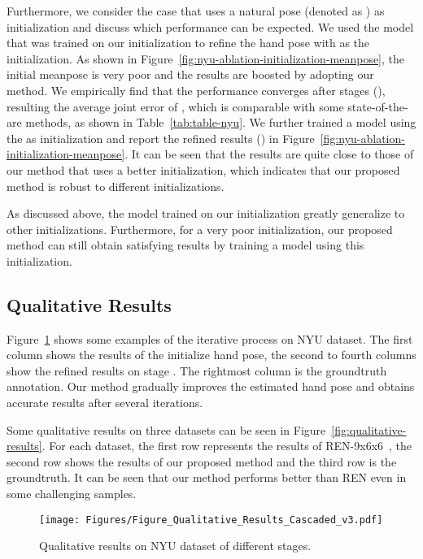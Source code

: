 \documentclass[final, 5p]{elsarticle}
\begin{document}
Furthermore, we consider the case that uses a natural pose (denoted as ) as initialization and discuss which performance can be expected. We used the model that was trained on our initialization to refine the hand pose with  as the initialization. As shown in Figure~\ref{fig:nyu-ablation-initialization-meanpose}, the initial meanpose is very poor and the results are boosted by adopting our method. We empirically find that the performance converges after  stages (), resulting the average joint error of , which is comparable with some state-of-the-are methods, as shown in Table~\ref{tab:table-nyu}.
We further trained a model using the  as initialization and report the refined results () in Figure~\ref{fig:nyu-ablation-initialization-meanpose}. It can be seen that the results are quite close to those of our method that uses a better initialization, which indicates that our proposed method is robust to different initializations.

As discussed above, the model trained on our initialization greatly generalize to other initializations. Furthermore, for a very poor initialization, our proposed method can still obtain satisfying results by training a model using this initialization.


\subsection{Qualitative Results}
\label{sec:qualitative}
Figure~\ref{fig:qualitative-cascaded} shows some examples of the iterative process on NYU dataset. The first column shows the results of the initialize hand pose, the second to fourth columns show the refined results on stage . The rightmost column is the groundtruth annotation. Our method gradually improves the estimated hand pose and obtains accurate results after several iterations.

Some qualitative results on three datasets can be seen in Figure~\ref{fig:qualitative-results}. For each dataset, the first row represents the results of REN-9x6x6~\cite{wang2018region}, the second row shows the results of our proposed method and the third row is the groundtruth. It can be seen that our method performs better than REN even in some challenging samples.

\begin{figure}[!tb]
\centering
\centerline{\texttt{[image: Figures/Figure\_Qualitative\_Results\_Cascaded\_v3.pdf]}}
\caption{Qualitative results on NYU dataset of different stages.}
\label{fig:qualitative-cascaded}
\end{figure}
\end{document}
